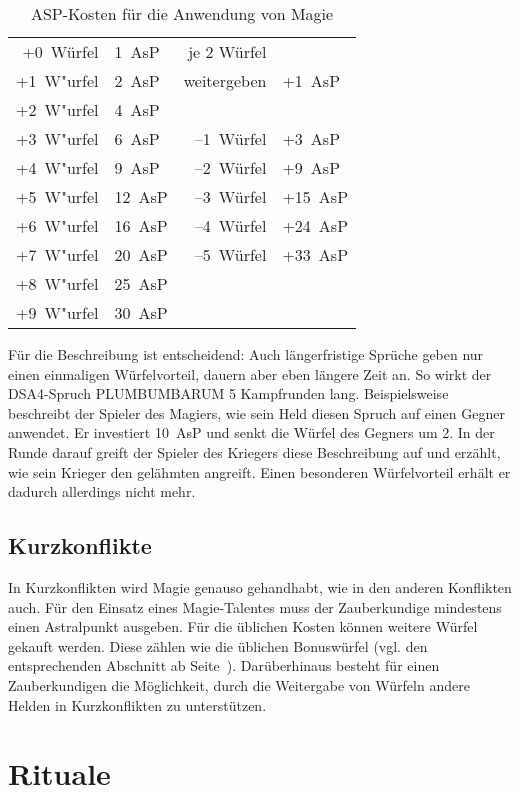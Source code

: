 \begin{table}
  \begin{tabular}[C]{|rlrl|}
  \hline
    +0~Würfel & 1~AsP & je 2 Würfel & \\
    +1~W"urfel & 2~AsP & weitergeben & +1~AsP \\ 
    +2~W"urfel & 4~AsP & & \\
    +3~W"urfel & 6~AsP &--1~Würfel & +3~AsP\\
    +4~W"urfel & 9~AsP & --2~Würfel & +9~AsP\\ 
    +5~W"urfel & 12~AsP &--3~Würfel & +15~AsP\\
    +6~W"urfel & 16~AsP &--4~Würfel & +24~AsP \\
    +7~W"urfel & 20~AsP &--5~Würfel & +33~AsP \\
    +8~W"urfel & 25~AsP && \\
    +9~W"urfel & 30~AsP && \\
  \hline
  \end{tabular}
  \caption{ASP-Kosten für die Anwendung von Magie}
  \label{TabelleASPKosten}
\end{table}

\BN Für die Beschreibung ist entscheidend: Auch längerfristige Sprüche geben nur einen einmaligen Würfelvorteil, dauern aber eben längere Zeit an. So wirkt der DSA4-Spruch PLUMBUMBARUM 5 Kampfrunden lang. Beispielsweise beschreibt der Spieler des Magiers, wie sein Held diesen Spruch auf einen Gegner anwendet. Er investiert 10~AsP und senkt die Würfel des Gegners um 2. In der Runde darauf greift der Spieler des Kriegers diese Beschreibung auf und erzählt, wie sein Krieger den gelähmten angreift. Einen besonderen Würfelvorteil erhält er dadurch allerdings nicht mehr.\EN

\subsection{Kurzkonflikte}
In Kurzkonflikten wird Magie genauso gehandhabt, wie in den anderen Konflikten auch. Für den Einsatz eines Magie-Talentes muss der Zauberkundige mindestens einen Astralpunkt ausgeben. Für die üblichen Kosten können weitere Würfel gekauft werden. Diese zählen wie die üblichen Bonuswürfel (vgl. den entsprechenden Abschnitt ab Seite~\pageref{Bonuswuerfel}). Darüberhinaus besteht für einen Zauberkundigen die Möglichkeit, durch die Weitergabe von Würfeln andere Helden in Kurzkonflikten zu unterstützen.

\BN
\section{Rituale}
\EN


